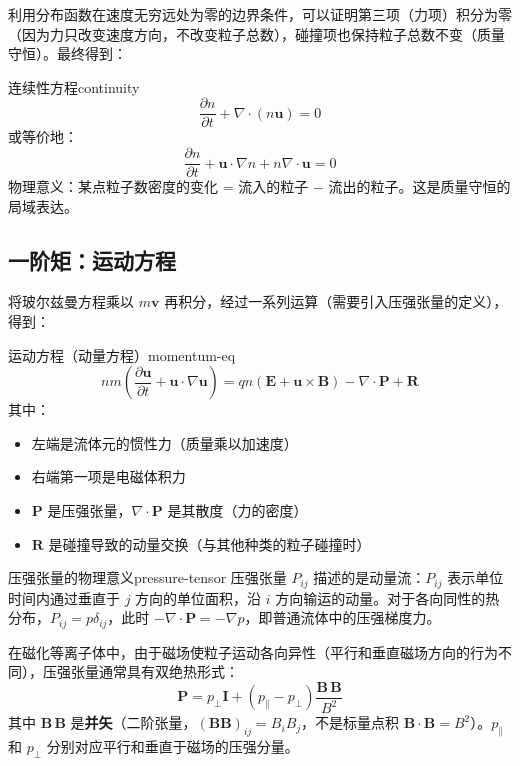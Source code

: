 \documentclass[12pt,a4paper,openany,oneside]{book}
\newcommand{\vect}[1]{\bm{#1}}
\newcommand{\grad}{\nabla}
\newcommand{\divg}{\nabla\cdot}
\begin{document}
利用分布函数在速度无穷远处为零的边界条件，可以证明第三项（力项）积分为零（因为力只改变速度方向，不改变粒子总数），碰撞项也保持粒子总数不变（质量守恒）。最终得到：

\begin{theorem}{连续性方程}{continuity}
\[
\frac{\partial n}{\partial t} + \divg(n\vect{u}) = 0
\]
或等价地：
\[
\frac{\partial n}{\partial t} + \vect{u}\cdot\grad n + n\divg\vect{u} = 0
\]
物理意义：某点粒子数密度的变化 = 流入的粒子 $-$ 流出的粒子。这是质量守恒的局域表达。
\end{theorem}

\subsection{一阶矩：运动方程}

将玻尔兹曼方程乘以 $m\vect{v}$ 再积分，经过一系列运算（需要引入压强张量的定义），得到：

\begin{theorem}{运动方程（动量方程）}{momentum-eq}
\[
nm\left(\frac{\partial\vect{u}}{\partial t} + \vect{u}\cdot\grad\vect{u}\right) = qn(\vect{E} + \vect{u}\times\vect{B}) - \grad\cdot\bm{P} + \vect{R}
\]
其中：
\begin{itemize}
\item 左端是流体元的惯性力（质量乘以加速度）
\item 右端第一项是电磁体积力
\item $\bm{P}$ 是压强张量，$\grad\cdot\bm{P}$ 是其散度（力的密度）
\item $\vect{R}$ 是碰撞导致的动量交换（与其他种类的粒子碰撞时）
\end{itemize}
\end{theorem}

\begin{insight}{压强张量的物理意义}{pressure-tensor}
压强张量 $P_{ij}$ 描述的是动量流：$P_{ij}$ 表示单位时间内通过垂直于 $j$ 方向的单位面积，沿 $i$ 方向输运的动量。对于各向同性的热分布，$P_{ij} = p\delta_{ij}$，此时 $-\grad\cdot\bm{P} = -\grad p$，即普通流体中的压强梯度力。

在磁化等离子体中，由于磁场使粒子运动各向异性（平行和垂直磁场方向的行为不同），压强张量通常具有双绝热形式：
\[
\bm{P} = p_\perp\bm{I} + (p_\parallel - p_\perp)\frac{\vect{B}\,\vect{B}}{B^2}
\]
其中 $\vect{B}\,\vect{B}$ 是\textbf{并矢}（二阶张量，$\left(\vect{B}\vect{B}\right)_{ij}=B_iB_j$，不是标量点积 $\vect{B}\cdot\vect{B}=B^2$）。$p_\parallel$ 和 $p_\perp$ 分别对应平行和垂直于磁场的压强分量。
\end{insight}
\end{document}
